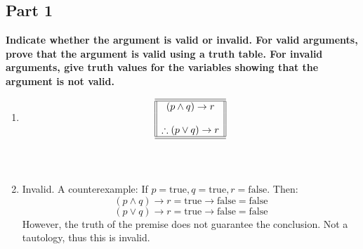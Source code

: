 \documentclass{amsart}
\theoremstyle{definition}
\theoremstyle{Exercise}
\theoremstyle{remark}
\theoremstyle{rule}
\numberwithin{equation}{section}
\begin{document}
\subsection*{Part 1}
{\bf Indicate whether the argument is valid or invalid. For valid arguments, prove that the argument is valid using a truth table. For invalid arguments, give truth values for the variables showing that the argument is not valid.}\\
 \begin{enumerate}

\item \[
\begin{array}{||c||}
\hline \hline
(p \land q) \to r\\
\\
\therefore (p \lor q) \to r\\
\hline \hline
\end{array}
\]\\\\
\item Invalid. A counterexample:
If \( p = \text{true}, q = \text{true}, r = \text{false} \). Then:
\[
(p \land q) \to r = \text{true} \to \text{false} = \text{false}
\]
\[
(p \lor q) \to r = \text{true} \to \text{false} = \text{false}
\]
However, the truth of the premise does not guarantee the conclusion. Not a tautology, thus this is invalid.
 \\\\
   \end{enumerate}
\end{document}
